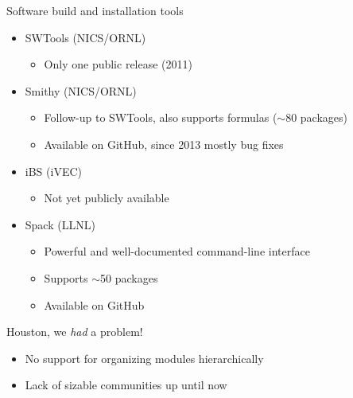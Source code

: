 \documentclass[10pt,xcolor={usenames,dvipsnames}]{beamer}
\begin{document}
\begin{frame}{Software build and installation tools}
\begin{itemize}
    \item
        SWTools (NICS/ORNL)
        \begin{itemize}
            \item
                Only one public release (2011)
        \end{itemize}
    \item
        Smithy (NICS/ORNL)
        \begin{itemize}
            \item
                Follow-up to SWTools, also supports formulas ($\sim$80 packages)
            \item
                Available on GitHub, since 2013 mostly bug fixes
        \end{itemize}
    \item
        iBS (iVEC)
        \begin{itemize}
            \item
                Not yet publicly available
        \end{itemize}
    \item
        Spack (LLNL)
        \begin{itemize}
            \item
                Powerful and well-documented command-line interface
            \item
                Supports $\sim$50 packages
            \item
                Available on GitHub
        \end{itemize}
\end{itemize}

\begin{center}
    \begin{minipage}{0.9\textwidth}
        \begin{alertblock}{\small Houston, we \emph{had} a problem!}
            \footnotesize
            \begin{itemize}
            \item No support for organizing modules hierarchically
            \item Lack of sizable communities up until now
            \end{itemize}
        \end{alertblock}
    \end{minipage}
\end{center}

\end{frame}
\end{document}
